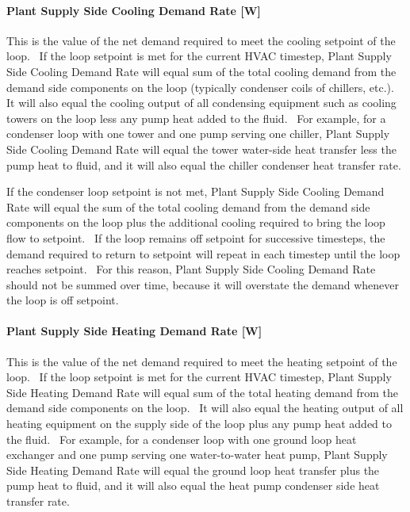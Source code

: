 \paragraph{Plant Supply Side Cooling Demand Rate {[}W{]}}\label{plant-supply-side-cooling-demand-rate-w-1}

This is the value of the net demand required to meet the cooling setpoint of the loop.~ If the loop setpoint is met for the current HVAC timestep, Plant Supply Side Cooling Demand Rate will equal sum of the total cooling demand from the demand side components on the loop (typically condenser coils of chillers, etc.).~ It will also equal the cooling output of all condensing equipment such as cooling towers on the loop less any pump heat added to the fluid.~ For example, for a condenser loop with one tower and one pump serving one chiller, Plant Supply Side Cooling Demand Rate will equal the tower water-side heat transfer less the pump heat to fluid, and it will also equal the chiller condenser heat transfer rate.

If the condenser loop setpoint is not met, Plant Supply Side Cooling Demand Rate will equal the sum of the total cooling demand from the demand side components on the loop plus the additional cooling required to bring the loop flow to setpoint.~ If the loop remains off setpoint for successive timesteps, the demand required to return to setpoint will repeat in each timestep until the loop reaches setpoint.~ For this reason, Plant Supply Side Cooling Demand Rate should not be summed over time, because it will overstate the demand whenever the loop is off setpoint.

\paragraph{Plant Supply Side Heating Demand Rate {[}W{]}}\label{plant-supply-side-heating-demand-rate-w-1}

This is the value of the net demand required to meet the heating setpoint of the loop.~ If the loop setpoint is met for the current HVAC timestep, Plant Supply Side Heating Demand Rate will equal sum of the total heating demand from the demand side components on the loop.~ It will also equal the heating output of all heating equipment on the supply side of the loop plus any pump heat added to the fluid.~ For example, for a condenser loop with one ground loop heat exchanger and one pump serving one water-to-water heat pump, Plant Supply Side Heating Demand Rate will equal the ground loop heat transfer plus the pump heat to fluid, and it will also equal the heat pump condenser side heat transfer rate.

